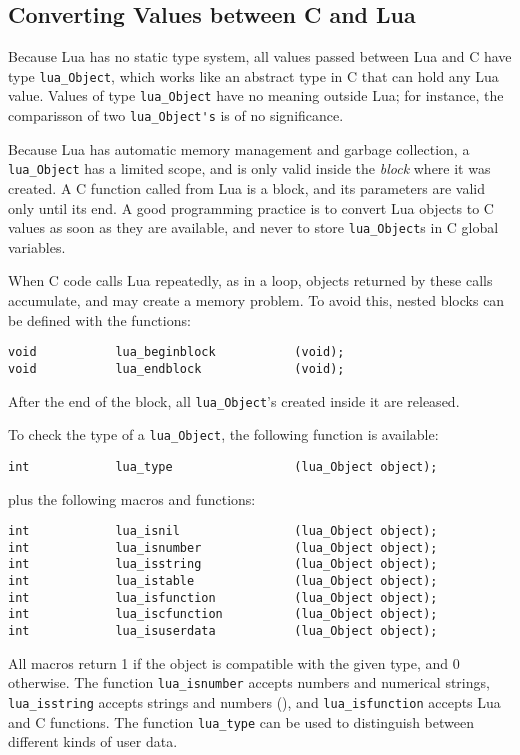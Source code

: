 \subsection{Converting Values between C and Lua} \label{valuesCLua}
Because Lua has no static type system,
all values passed between Lua and C have type
\verb'lua_Object',
which works like an abstract type in C that can hold any Lua value.
Values of type \verb'lua_Object' have no meaning outside Lua;
for instance,
the comparisson of two \verb"lua_Object's" is of no significance.

Because Lua has automatic memory management and garbage collection,
a \verb'lua_Object' has a limited scope,
and is only valid inside the {\em block\/} where it was created.
A C function called from Lua is a block,
and its parameters are valid only until its end.
A good programming practice is to convert Lua objects to C values
as soon as they are available,
and never to store \verb'lua_Object's in C global variables.

When C code calls Lua repeatedly, as in a loop,
objects returned by these calls accumulate,
and may create a memory problem.
To avoid this,
nested blocks can be defined with the functions:
\begin{verbatim}
void           lua_beginblock           (void);
void           lua_endblock             (void);
\end{verbatim}
After the end of the block,
all \verb'lua_Object''s created inside it are released.

To check the type of a \verb'lua_Object',
the following function is available:
\begin{verbatim}
int            lua_type                 (lua_Object object);
\end{verbatim}
plus the following macros and functions:
\begin{verbatim}
int            lua_isnil                (lua_Object object);
int            lua_isnumber             (lua_Object object);
int            lua_isstring             (lua_Object object);
int            lua_istable              (lua_Object object);
int            lua_isfunction           (lua_Object object);
int            lua_iscfunction          (lua_Object object);
int            lua_isuserdata           (lua_Object object);
\end{verbatim}
All macros return 1 if the object is compatible with the given type,
and 0 otherwise.
The function \verb'lua_isnumber' accepts numbers and numerical strings,
\verb'lua_isstring' accepts strings and numbers (),
and \verb'lua_isfunction' accepts Lua and C functions.
The function \verb'lua_type' can be used to distinguish between
different kinds of user data.

